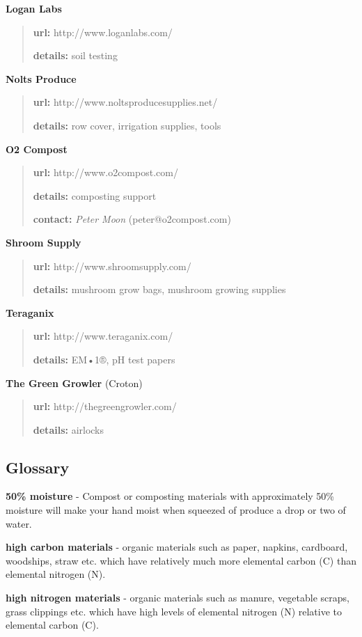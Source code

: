 \textbf{Logan Labs}

\begin{quote}
\textbf{url:} http://www.loganlabs.com/

\textbf{details:} soil testing
\end{quote}

\textbf{Nolts Produce}

\begin{quote}
\textbf{url:} http://www.noltsproducesupplies.net/

\textbf{details:} row cover, irrigation supplies, tools
\end{quote}

\textbf{O2 Compost}

\begin{quote}
\textbf{url:} http://www.o2compost.com/

\textbf{details:} composting support

\textbf{contact:} \emph{Peter Moon} (peter@o2compost.com)
\end{quote}

\textbf{Shroom Supply}

\begin{quote}
\textbf{url:} http://www.shroomsupply.com/

\textbf{details:} mushroom grow bags, mushroom growing supplies
\end{quote}

\textbf{Teraganix}

\begin{quote}
\textbf{url:} http://www.teraganix.com/

\textbf{details:} EM•1®, pH test papers
\end{quote}

\textbf{The Green Growler} (Croton)

\begin{quote}
\textbf{url:} http://thegreengrowler.com/

\textbf{details:} airlocks
\end{quote}

\subsection{Glossary}\label{glossary}

\textbf{50\% moisture} - Compost or composting materials with
approximately 50\% moisture will make your hand moist when squeezed of
produce a drop or two of water.

\textbf{high carbon materials} - organic materials such as paper,
napkins, cardboard, woodships, straw etc. which have relatively much
more elemental carbon (C) than elemental nitrogen (N).

\textbf{high nitrogen materials} - organic materials such as manure,
vegetable scraps, grass clippings etc. which have high levels of
elemental nitrogen (N) relative to elemental carbon (C).
